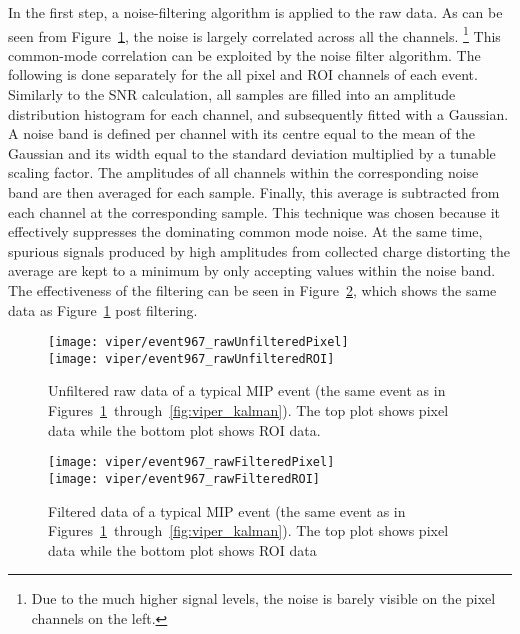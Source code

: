 In the first step, a noise-filtering algorithm is applied to the raw data.
As can be seen from Figure~\ref{fig:viper_unfilteredRawData}, the noise is largely correlated across all the channels.
\footnote{Due to the much higher signal levels, the noise is barely visible on the pixel channels on the left.}
This common-mode correlation can be exploited by the noise filter algorithm.
The following is done separately for the all pixel and ROI channels of each event.
Similarly to the SNR calculation, all samples are filled into an amplitude distribution histogram for each channel, and subsequently fitted with a Gaussian.
A noise band is defined per channel with its centre equal to the mean of the Gaussian and its width equal to the standard deviation multiplied by a tunable scaling factor.
The amplitudes of all channels within the corresponding noise band are then averaged for each sample.
Finally, this average is subtracted from each channel at the corresponding sample.
This technique was chosen because it effectively suppresses the dominating common mode noise.
At the same time, spurious signals produced by high amplitudes from collected charge distorting the average are kept to a minimum by only accepting values within the noise band.
The effectiveness of the filtering can be seen in Figure~\ref{fig:viper_filteredRawData}, which shows the same data as Figure~\ref{fig:viper_unfilteredRawData} post filtering.

\begin{figure}[htb]
	\centering
	\texttt{[image: viper/event967\_rawUnfilteredPixel]}\\
	\texttt{[image: viper/event967\_rawUnfilteredROI]}
	\caption{Unfiltered raw data of a typical MIP event (the same event as in Figures~\ref{fig:viper_unfilteredRawData}~through~\ref{fig:viper_kalman}). The top plot shows pixel data while the bottom plot shows ROI data.}
	\label{fig:viper_unfilteredRawData}
\end{figure}

\begin{figure}[htb]
	\centering
	\texttt{[image: viper/event967\_rawFilteredPixel]}\\
	\texttt{[image: viper/event967\_rawFilteredROI]}
	\caption{Filtered data of a typical MIP event (the same event as in Figures~\ref{fig:viper_unfilteredRawData}~through~\ref{fig:viper_kalman}). The top plot shows pixel data while the bottom plot shows ROI data}
	\label{fig:viper_filteredRawData}
\end{figure}

